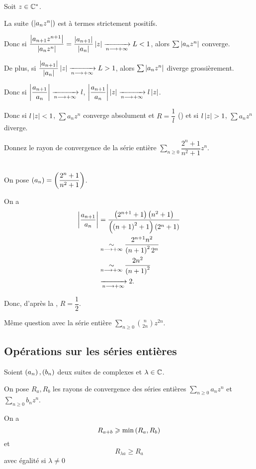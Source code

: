 \begin{dem}
Soit \(z\in\mathbb{C}^*\).

La suite \(\left(\left\lvert a_nz^n\right\rvert\right)\) est à termes strictement positifs.

Donc si \(\dfrac{\left\lvert a_{n+1}z^{n+1}\right\rvert}{\left\lvert a_nz^n\right\rvert}=\dfrac{\left\lvert a_{n+1}\right\rvert}{\left\lvert a_n\right\rvert}\left\lvert z\right\rvert\xrightarrow[n\longrightarrow+\infty]{}L<1\), alors \(\sum\left\lvert a_nz^n\right\rvert\) converge.

De plus, si \(\dfrac{\left\lvert a_{n+1}\right\rvert}{\left\lvert a_n\right\rvert}\left\lvert z\right\rvert\xrightarrow[n\longrightarrow+\infty]{}L>1\), alors \(\sum\left\lvert a_nz^n\right\rvert\) diverge grossièrement.

Donc si \(\left\lvert\dfrac{a_{n+1}}{a_n}\right\rvert\xrightarrow[n\longrightarrow+\infty]{}l\), \(\left\lvert\dfrac{a_{n+1}}{a_n}\right\rvert\left\lvert z\right\rvert\xrightarrow[n\longrightarrow+\infty]{}l\left\lvert z\right\rvert\).

Donc si \(l\left\lvert z\right\rvert<1\), \(\sum a_nz^n\) converge absolument et \(R=\dfrac{1}{l}\) () et si \(l\left\lvert z\right\rvert>1\), \(\sum a_nz^n\) diverge.
\end{dem}

\begin{exo}
Donnez le rayon de convergence de la série entière \(\sum_{n\geq0}\dfrac{2^n+1}{n^2+1}z^n\).
\end{exo}

\begin{corr}~\\
On pose \(\left(a_n\right)=\left(\dfrac{2^n+1}{n^2+1}\right)\).

On a \[\begin{aligned}
\left\lvert\dfrac{a_{n+1}}{a_n}\right\rvert&=\dfrac{\left(2^{n+1}+1\right)\left(n^2+1\right)}{\left(\left(n+1\right)^2+1\right)\left(2^n+1\right)} \\
&\underset{n\longrightarrow+\infty}{\sim}\dfrac{2^{n+1}n^2}{\left(n+1\right)^22^n} \\
&\underset{n\longrightarrow+\infty}{\sim}\dfrac{2n^2}{\left(n+1\right)^2} \\
&\xrightarrow[n\longrightarrow+\infty]{}2.
\end{aligned}\]

Donc, d'après la , \(R=\dfrac{1}{2}\).
\end{corr}

\begin{exo}
Même question avec la série entière \(\sum_{n\geq0}\binom{n}{2n}z^{2n}\).
\end{exo}

\subsection{Opérations sur les séries entières}

\begin{prop}
Soient \(\left(a_n\right),\left(b_n\right)\) deux suites de complexes et \(\lambda\in\mathbb{C}\).

On pose \(R_a,R_b\) les rayons de convergence des séries entières \(\sum_{n\geq0}a_nz^n\) et \(\sum_{n\geq0}b_nz^n\).

On a \[R_{a+b}\geqslant\min\left(R_a,R_b\right)\] et \[R_{\lambda a}\geq R_a\] avec égalité si \(\lambda\not=0\)
\end{prop}

